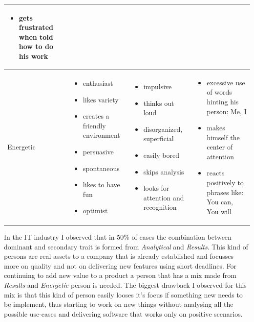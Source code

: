 \begin{table}[h]
\begin{tabular}{p{}p{}p{}p{}}
\begin{itemize}
       \item gets frustrated when told how to do his work
      \end{itemize}
     \\ \midrule
    Energetic 
     &
      \begin{itemize}
       \item enthusiast
       \item likes variety
       \item creates a friendly environment
       \item persuasive 
       \item spontaneous
       \item likes to have fun
       \item optimist
      \end{itemize}
     &
     \begin{itemize}
      \item impulsive
      \item thinks out loud
      \item disorganized, superficial
      \item easily bored
      \item skips analysis
      \item looks for attention and recognition
     \end{itemize}
     & 
      \begin{itemize}
       \item excessive use of words hinting his person: Me, I 
       \item makes himself the center of attention
       \item reacts positively to phrases like: You can, You will
      \end{itemize}
     \\ \bottomrule
    \end{tabular}
    \label{table:prae}
\end{table}
\FloatBarrier

In the IT industry I observed that in 50\% of cases the combination between dominant and secondary trait is formed from \textit{Analytical} and \textit{Results}. This kind of persons are real assets to a company that is already established and focusses more on quality and not on delivering new features using short deadlines. For continuing to add new value to a product a person that has a mix made from \textit{Results} and \textit{Energetic} person is needed. The biggest drawback I observed for this mix is that this kind of person easily looses it's focus if something new needs to be implement, thus starting to work on new things without analysing all the possible use-cases and delivering software that works only on positive scenarios.
